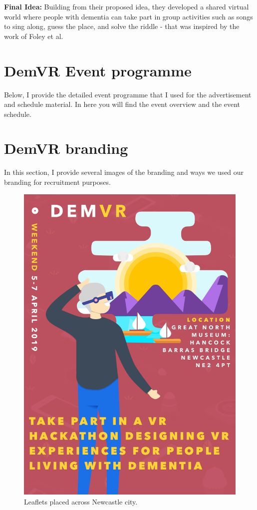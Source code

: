 \textbf{Final Idea:} Building from their proposed idea, they developed a shared virtual world where people with dementia can take part in group activities such as songs to sing along, guess the place, and solve the riddle - that was inspired by the work of Foley et al. \citep{foley_printer_2019}

\section{DemVR Event programme}
\label{app:DemVREvent}
Below, I provide the detailed event programme that I used for the advertisement and schedule material. In here you will find the event overview and the event schedule. 

\section{DemVR branding}
\label{app:Branding}
In this section, I provide several images of the branding and ways we used our branding for recruitment purposes.


\begin{figure}[htp]
    \centering
    \includegraphics[width=0.8\linewidth]{Images/Appendix/DemVR appendix/DemVR Flyer.png}
    \caption{Leaflets placed across Newcastle city.}
    \label{fig:App:Leaflets}
\end{figure}

